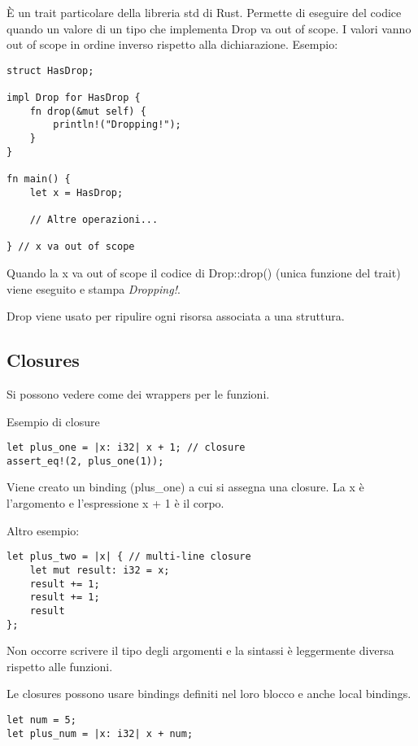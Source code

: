 È un trait particolare della libreria std di Rust. Permette di eseguire del
codice quando un valore di un tipo che implementa Drop va out of scope.
I valori vanno out of scope in ordine inverso rispetto alla
dichiarazione.
Esempio:

\begin{lstlisting}
struct HasDrop;

impl Drop for HasDrop {
    fn drop(&mut self) {
        println!("Dropping!");
    }
}

fn main() {
    let x = HasDrop;

    // Altre operazioni...

} // x va out of scope
\end{lstlisting}

Quando la x va out of scope il codice di Drop::drop() (unica funzione del trait)
viene eseguito e stampa \textit{Dropping!}.

Drop viene usato per ripulire ogni risorsa associata a una
struttura.

\subsection{Closures}

Si possono vedere come dei wrappers per le funzioni.

Esempio di closure

\begin{lstlisting}
let plus_one = |x: i32| x + 1; // closure
assert_eq!(2, plus_one(1));
\end{lstlisting}

Viene creato un binding (plus\_one) a cui si assegna una closure.
La x è l’argomento e l’espressione x + 1 è il corpo.

Altro esempio:

\begin{lstlisting}
let plus_two = |x| { // multi-line closure
    let mut result: i32 = x;
    result += 1;
    result += 1;
    result
};
\end{lstlisting}

Non occorre scrivere il tipo degli argomenti e la sintassi è leggermente diversa
rispetto alle funzioni.

Le closures possono usare bindings definiti nel loro blocco e anche local
bindings.

\begin{lstlisting}
let num = 5;
let plus_num = |x: i32| x + num;
\end{lstlisting}


